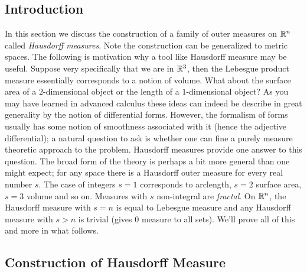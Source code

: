 \subsection{Introduction}

In this section we discuss the construction of a family of outer
measures on $\mathbb{R}^n$ called \emph{Hausdorff measures}.  Note the
construction can be generalized to metric spaces.  The following is
motivation why a tool like Hausdorff measure may be useful.  Suppose
very specifically that we are
in $\mathbb{R}^3$, then the Lebesgue product measure essentially
corresponds to a notion of volume.  What about the surface area of a
$2$-dimensional object or the length of a $1$-dimensional object?  As
you may have learned in advanced calculus these ideas can indeed be
describe in great generality by the notion of differential forms.
However, the formalism of forms usually has some notion of smoothness
associated with it (hence the adjective differential); a natural question to ask is whether one can fine
a purely measure theoretic approach to the problem.  Hausdorff measures
provide one answer to this question.   The broad form of the theory
is perhaps a bit more general than one might expect; for any space
there is a Hausdorff outer measure for every real number $s$.  The
case of integers
$s=1$ corresponds to arclength, $s=2$ surface area, $s=3$ volume and so
on.  Measures with $s$ non-integral are
\emph{fractal}.  On $\mathbb{R}^n$, the Hausdorff measure with $s=n$ is equal to
Lebesgue measure and any Hausdorff measure with $s > n$ is trivial
(gives $0$ measure to all sets).  We'll prove all of this and more in
what follows.

\subsection{Construction of Hausdorff Measure}

